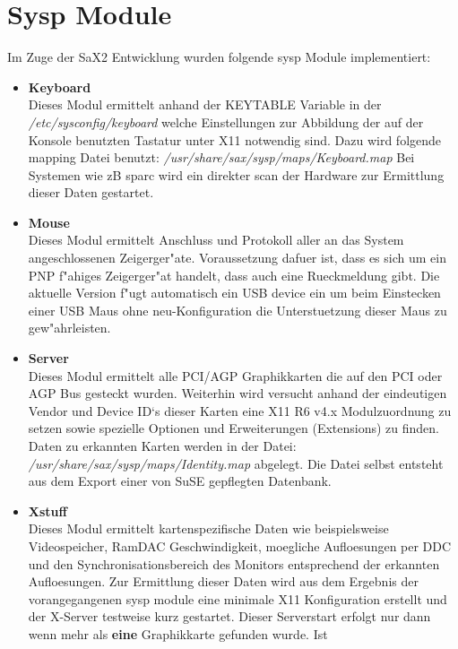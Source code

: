 \section{Sysp Module}
Im Zuge der SaX2 Entwicklung wurden folgende sysp Module implementiert:
\begin{itemize}
\item \textbf{Keyboard}\\
      Dieses Modul ermittelt anhand der KEYTABLE Variable in der
      \textit{/etc/sysconfig/keyboard} welche Einstellungen zur Abbildung der
      auf der Konsole benutzten Tastatur unter X11 notwendig sind. Dazu 
      wird folgende mapping Datei benutzt: 
      \textit{/usr/share/sax/sysp/maps/Keyboard.map}
      Bei Systemen wie zB sparc wird ein direkter scan der
      Hardware zur Ermittlung dieser Daten gestartet.
\item \textbf{Mouse}\\
      Dieses Modul ermittelt Anschluss und Protokoll aller an das System 
      angeschlossenen Zeigerger"ate. Voraussetzung dafuer ist, dass 
      es sich um ein PNP f"ahiges Zeigerger"at handelt, dass auch eine 
      Rueckmeldung gibt. Die aktuelle Version f"ugt automatisch ein
      USB device ein um beim Einstecken einer USB Maus ohne neu-Konfiguration
      die Unterstuetzung dieser Maus zu gew"ahrleisten.
\item \textbf{Server}\\
      Dieses Modul ermittelt alle PCI/AGP Graphikkarten die auf den 
      PCI oder AGP Bus gesteckt wurden. Weiterhin wird versucht anhand
      der eindeutigen Vendor und Device ID`s dieser Karten eine 
      X11 R6 v4.x Modulzuordnung zu setzen sowie spezielle Optionen 
      und Erweiterungen (Extensions) zu finden. Daten zu erkannten
      Karten werden in der Datei: 
      \textit{/usr/share/sax/sysp/maps/Identity.map} abgelegt.
      Die Datei selbst entsteht aus dem Export einer von SuSE gepflegten
      Datenbank.
\item \textbf{Xstuff}\\
      Dieses Modul ermittelt kartenspezifische Daten wie beispielsweise
      Videospeicher, RamDAC Geschwindigkeit, moegliche Aufloesungen per DDC
      und den Synchronisationsbereich des Monitors entsprechend der erkannten 
      Aufloesungen. Zur Ermittlung dieser Daten wird aus dem Ergebnis der 
      vorangegangenen sysp module eine minimale X11 Konfiguration erstellt
      und der X-Server testweise kurz gestartet. Dieser Serverstart erfolgt nur
      dann wenn mehr als \textbf{eine} Graphikkarte gefunden wurde. Ist

\end{itemize}

